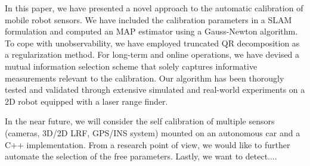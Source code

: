 In this paper, we have presented a novel approach to the automatic calibration
of mobile robot sensors. We have included the calibration parameters in a SLAM
formulation and computed an MAP estimator using a Gauss-Newton algorithm. To
cope with unobservability, we have employed truncated QR decomposition as a
regularization method. For long-term and online operations, we have devised
a mutual information selection scheme that solely captures informative
measurements relevant to the calibration. Our algorithm has been thorougly
tested and validated through extensive simulated and real-world experiments on
a 2D robot equipped with a laser range finder.

In the near future, we will consider the self calibration of multiple sensors
(cameras, 3D/2D LRF, GPS/INS system) mounted on an autonomous car and a C++
implementation. From a research point of view, we would like to further automate
the selection of the free parameters. Lastly, we want to detect....
